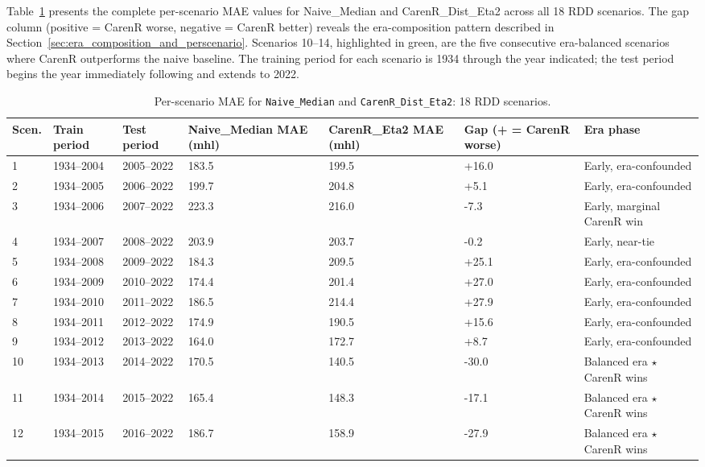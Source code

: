 Table~\ref{tab:ch5b_1} presents the complete per-scenario MAE values for Naive\_Median and CarenR\_Dist\_Eta2 across all 18 RDD scenarios. The gap column (positive = CarenR worse, negative = CarenR better) reveals the era-composition pattern described in Section~\ref{sec:era_composition_and_perscenario}. Scenarios 10--14, highlighted in green, are the five consecutive era-balanced scenarios where CarenR outperforms the naive baseline. The training period for each scenario is 1934 through the year indicated; the test period begins the year immediately following and extends to 2022.

\begin{table}[htbp]
  \centering
  \caption{Per-scenario MAE for \texttt{Naive\_Median} and \texttt{CarenR\_Dist\_Eta2}: 18 RDD scenarios.}\label{tab:ch5b_1}
  \small
  \begin{adjustbox}{max width=\textwidth}
    \begin{tabularx}{\textwidth}{p{0.7cm}|p{1.6cm}|p{1.6cm}|p{1.5cm}|p{1.5cm}|p{1.6cm}|X}
  \toprule
  Scen. & Train period & Test period & Naive\_Median
MAE (mhl) & CarenR\_Eta2
MAE (mhl) & Gap
(+ = CarenR worse) & Era phase \\
  \midrule
  1 & 1934--2004 & 2005--2022 & 183.5 & 199.5 & +16.0 & Early, era-confounded \\
  2 & 1934--2005 & 2006--2022 & 199.7 & 204.8 & +5.1 & Early, era-confounded \\
  3 & 1934--2006 & 2007--2022 & 223.3 & 216.0 & -7.3 & Early, marginal CarenR win \\
  4 & 1934--2007 & 2008--2022 & 203.9 & 203.7 & -0.2 & Early, near-tie \\
  5 & 1934--2008 & 2009--2022 & 184.3 & 209.5 & +25.1 & Early, era-confounded \\
  6 & 1934--2009 & 2010--2022 & 174.4 & 201.4 & +27.0 & Early, era-confounded \\
  7 & 1934--2010 & 2011--2022 & 186.5 & 214.4 & +27.9 & Early, era-confounded \\
  8 & 1934--2011 & 2012--2022 & 174.9 & 190.5 & +15.6 & Early, era-confounded \\
  9 & 1934--2012 & 2013--2022 & 164.0 & 172.7 & +8.7 & Early, era-confounded \\
  10 & 1934--2013 & 2014--2022 & 170.5 & 140.5 & -30.0 & Balanced era $\star$ CarenR wins \\
  11 & 1934--2014 & 2015--2022 & 165.4 & 148.3 & -17.1 & Balanced era $\star$ CarenR wins \\
  12 & 1934--2015 & 2016--2022 & 186.7 & 158.9 & -27.9 & Balanced era $\star$ CarenR wins \\

\end{tabularx}
\end{adjustbox}
\end{table}
